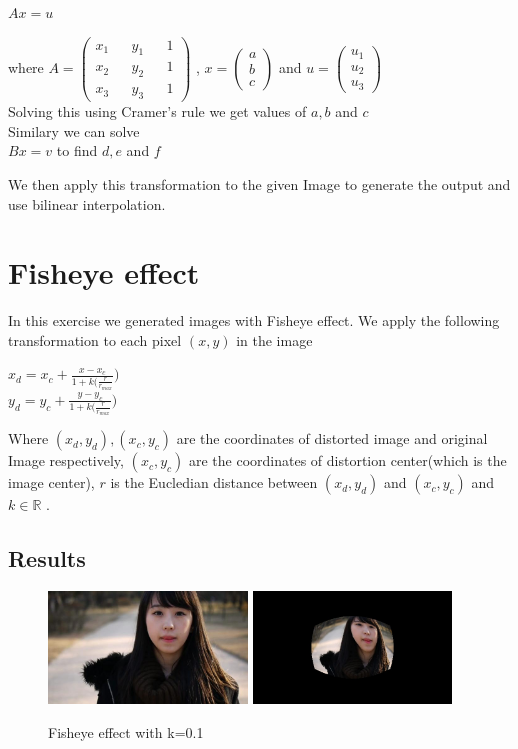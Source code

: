 \documentclass[paper=a4, fontsize=11pt]{scrartcl} %
\numberwithin{equation}{section} %
\numberwithin{figure}{section} %
\numberwithin{table}{section} %
\begin{document}
\(Ax = u\)

where \( A =
        \begin{pmatrix}
          x_1 && y_1 && 1\\
          x_2 && y_2 && 1\\
          x_3 && y_3 && 1  
        \end{pmatrix}
      \) , \(x = \begin{pmatrix} a\\ b\\ c \end{pmatrix}\) and \(u = \begin{pmatrix} u_1\\ u_2\\ u_3 \end{pmatrix}\)
\\Solving this using Cramer's rule we get values of \(a, b\) and \(c\)
\\Similary we can solve
\\\(Bx = v\) to find \(d,e\) and \(f\)

We then apply this transformation to the given Image to generate the output and use bilinear interpolation. 


\section{Fisheye effect}

In this exercise we generated images with Fisheye effect. We apply the following transformation to each pixel \((x,y)\) in the image

\(x_d = x_c + \frac{x - x_c}{1 + k(\frac{r}{r_{max}}}) \)\\
\(y_d = y_c + \frac{y - y_c}{1 + k(\frac{r}{r_{max}}}) \)

Where \((x_d, y_d), (x_c, y_c)\) are the coordinates of distorted image and original Image respectively, \((x_c,y_c)\) are the coordinates of distortion center(which is the image center), \(r\) is the Eucledian distance between \((x_d, y_d)\) and \((x_c, y_c)\) and \(k \in \mathbb{R}\) .

\subsection{Results}
  \begin {figure}[h!]
    \centering
    \includegraphics[clip,height=3cm]{1}
    \includegraphics[clip,height=3cm]{Fisheye01}
    \caption {Fisheye effect with k=0.1}
  \end{figure}
\end{document}
